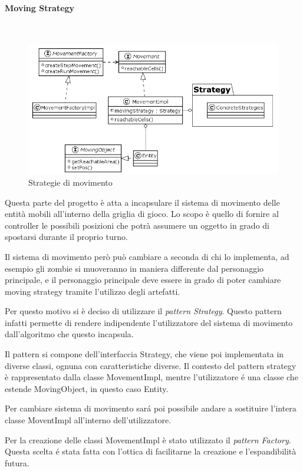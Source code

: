 \documentclass[a4paper,titlepage,12pt]{article}
\begin{document}
\paragraph{Moving Strategy}
\par \noindent \\
\begin{figure}[H]
    \centering
    \includegraphics[scale=0.6]{img/uml/Movement.png}
    \caption{Strategie di movimento}
    \label{fig: Strategie di movimento}
\end{figure}
\par \noindent Questa parte del progetto è atta a incapsulare il sistema di movimento delle entità mobili all’interno della griglia di gioco. Lo scopo è quello di fornire al controller le possibili posizioni che potrà assumere un oggetto in grado di spostarsi durante il proprio turno.
\par \noindent Il sistema di movimento però può cambiare a seconda di chi lo implementa, ad esempio gli zombie si muoveranno in maniera differente dal personaggio principale, e il personaggio principale deve essere in grado di poter cambiare moving strategy tramite l’utilizzo degli artefatti. 
\par \noindent Per questo motivo si è deciso di utilizzare il \textit{pattern Strategy}. Questo pattern infatti permette di rendere indipendente l’utilizzatore del sistema di movimento dall'algoritmo che questo incapsula. 
\par \noindent Il pattern si compone dell’interfaccia Strategy, che viene poi implementata in diverse classi, ognuna con caratteristiche diverse. Il contesto del pattern strategy è rappresentato dalla classe MovementImpl, mentre l’utilizzatore é una classe che estende MovingObject, in questo caso Entity. 
\par \noindent Per cambiare sistema di movimento sará poi possibile  andare a sostituire l’intera classe MoventImpl all’interno dell’utilizzatore.
\par \noindent Per la creazione delle classi MovementImpl è stato utilizzato il \textit{pattern Factory}. Questa scelta é stata fatta con l’ottica di facilitarne la creazione e l’espandibilità futura.
\end{document}
